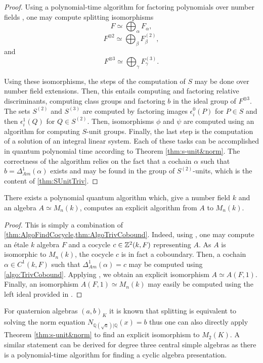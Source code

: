 \begin{proof}
    Using a polynomial-time algorithm for factoring polynomials over number fields \cite{lenstra1983factoring}, one may compute splitting isomorphisms 
    \[F \simeq \bigoplus_\alpha F_\alpha,\]
    \[F^{\otimes 2} \simeq \bigoplus_\beta F^{(2)}_\beta,\]
    and
    \[F^{\otimes 3} \simeq \bigoplus_\gamma F^{(3)}_\gamma.\]

    Using these isomorphisms, the steps of the computation of \(S\) may be done over number field extensions. Then, this entails computing and factoring relative discriminants, computing class groups and factoring \(b\) in the ideal group of \(F^{\otimes 3}\). The sets \(S^{(2)}\) and \(S^{(3)}\) are computed by factoring images \(\epsilon_i^0(P)\) for \(P \in S\) and then \(\epsilon_i^1(Q)\) for \(Q \in S^{(2)}\). Then, isomorphisms \(\phi\) and \(\psi\) are computed using an algorithm for computing \(S\)-unit groups. Finally, the last step is the computation of a solution of an integral linear system.
    Each of these tasks can be accomplished in quantum polynomial time according to Theorem \ref{thm:s-unit&norm}. 
    The correctness of the algorithm relies on the fact that a cochain \(\alpha\) such that \(b = \Delta_{Am}^1(\alpha)\) exists and may be found in the group of \(S^{(2)}\)-units, which is the content of \cref{thm:SUnitTriv}.
\end{proof}

\begin{cor}\label{cor:QuantumSplit}
    There exists a polynomial quantum algorithm which, give a number field \(k\) and an algebra \(A \simeq M_n(k)\), computes an explicit algorithm from \(A\) to \(M_n(k)\).
\end{cor}

\begin{proof}
    This is simply a combination of \cref{thm:AlgoFindCocycle,thm:AlgoTrivCobound}. Indeed, using , one may compute an étale \(k\) algebra \(F\) and a cocycle \(c \in \mathbb{Z}^2(k,F)\) representing \(A\). As \(A\) is isomorphic to \(M_n(k)\), the cocycle \(c\) is in fact a coboundary. Then, a cochain \(\alpha \in C^1(k,F)\) such that \(\Delta_{Am}^1(\alpha) = c\) may be computed using \cref{algo:TrivCobound}. Applying , we obtain an explicit isomorphism \(A \simeq A(F,1)\). Finally, an isomorphism \(A(F,1) \simeq M_n(k)\) may easily be computed using the left ideal provided in .
\end{proof}
\begin{remark}
For quaternion algebras $(a,b)_K$ it is known that splitting is equivalent to solving the norm equation $N_{\mathbb{Q(\sqrt{a})}|\mathbb{Q}}(x)=b$ thus one can also directly apply Theorem \ref{thm:s-unit&norm} to find an explicit isomorphism to $M_2(K)$. A similar statement can be derived for degree three central simple algebras as there is a polynomial-time algorithm for finding a cyclic algebra presentation. 
\end{remark}
